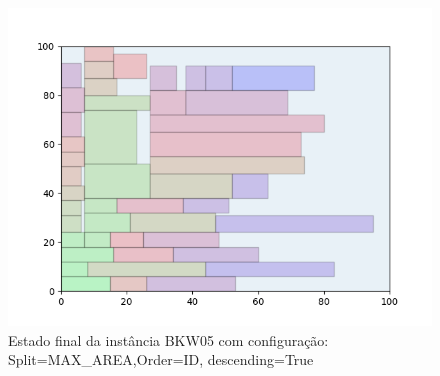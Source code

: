 \begin{figure}[H]
    \centering
    \caption[]{Estado final da instância BKW05 com configuração: Split=MAX_AREA,Order=ID, descending=True}
    \label{fig:bkw05-max_area-id-true}
    \includegraphics[scale=0.5]{output/figures/bkw/bkw05/max_area/id/true/00}
\end{figure}